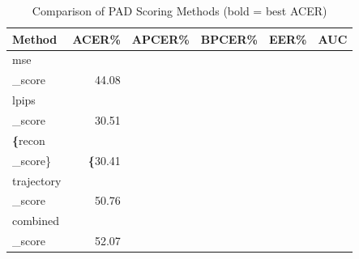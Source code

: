 \begin{table}[htbp]
  \centering
  \caption{Comparison of PAD Scoring Methods (bold = best ACER)}
  \label{tab:scoring_methods}
  \begin{tabular}{lrrrrr}
    \toprule
    Method & ACER\% & APCER\% & BPCER\% & EER\% & AUC \\
    \midrule
    mse\\_score & 44.08\\%
    lpips\\_score & 30.51\\%
    \textbf\{recon\\_score\} & \textbf\{30.41\\%
    trajectory\\_score & 50.76\\%
    combined\\_score & 52.07\\%
    \bottomrule
  \end{tabular}
\end{table}